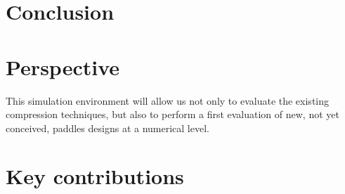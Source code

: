 
\chapter*{Conclusion}\label{section:generalconclusion}
\cleardoublepage
\chapter*{Perspective}\label{section:perspectives}

 This simulation environment will allow us not only to evaluate the existing compression techniques, but also to perform a first evaluation of new, not yet conceived, paddles designs at a numerical level. 
 \cleardoublepage
\chapter*{Key contributions}\label{section:keycontributions}
\cleardoublepage
